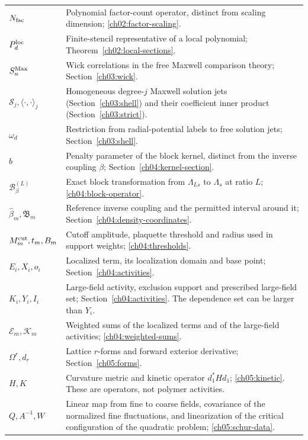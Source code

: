 {\begin{longtable}{@{}p{}p{}@{}}
$N_{\rm fac}$ & Polynomial factor-count operator, distinct from scaling dimension; \eqref{ch02:factor-scaling}.\\[2pt]
$P_d^{\rm loc}$ & Finite-stencil representative of a local polynomial; Theorem~\ref{ch02:local-sections}.\\[2pt]
$S_n^{\rm Max}$ & Wick correlations in the free Maxwell comparison theory; Section~\ref{ch03:wick}.\\[2pt]
$\mathcal S_j,\langle\cdot,\cdot\rangle_j$ & Homogeneous degree-$j$ Maxwell solution jets (Section~\ref{ch03:shell}) and their coefficient inner product (Section~\ref{ch03:strict}).\\[2pt]
$\omega_d$ & Restriction from radial-potential labels to free solution jets; Section~\ref{ch03:shell}.\\[2pt]
$b$ & Penalty parameter of the block kernel, distinct from the inverse coupling $\beta$; Section~\ref{ch04:kernel-section}.\\[2pt]
$\mathcal B^{(L)}_\beta$ & Exact block transformation from $\Lambda_{Ls}$ to $\Lambda_s$ at ratio $L$; \eqref{ch04:block-operator}.\\[2pt]
$\widehat\beta_m,\mathfrak B_m$ & Reference inverse coupling and the permitted interval around it; Section~\ref{ch04:density-coordinates}.\\[2pt]
$M_m^{\rm cut},t_m,B_m$ & Cutoff amplitude, plaquette threshold and radius used in support weights; \eqref{ch04:thresholds}.\\[2pt]
$E_i,X_i,o_i$ & Localized term, its localization domain and base point; Section~\ref{ch04:activities}.\\[2pt]
$K_i,Y_i,I_i$ & Large-field activity, exclusion support and prescribed large-field set; Section~\ref{ch04:activities}. The dependence set can be larger than $Y_i$.\\[2pt]
$\mathcal E_m,\mathcal K_m$ & Weighted sums of the localized terms and of the large-field activities; \eqref{ch04:weighted-sums}.\\[2pt]
$\Omega^r,d_r$ & Lattice $r$-forms and forward exterior derivative; Section~\ref{ch05:forms}.\\[2pt]
$H,K$ & Curvature metric and kinetic operator $d_1^*Hd_1$; \eqref{ch05:kinetic}. These are operators, not polymer activities.\\[2pt]
$Q,A^{-1},W$ & Linear map from fine to coarse fields, covariance of the normalized fine fluctuations, and linearization of the critical configuration of the quadratic problem; \eqref{ch05:schur-data}.\\[2pt]

\end{longtable}}

